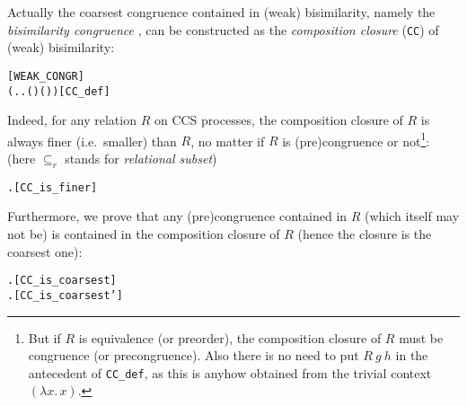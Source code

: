 Actually the coarsest congruence
contained in (weak) bisimilarity, namely the \emph{bisimilarity
  congruence} \cite{van2005characterisation}, can be constructed as
the \emph{composition closure} (\texttt{CC}) of (weak) bisimilarity:
\begin{alltt}
 \HOLSymConst{=}  \hfill{[WEAK_CONGR]}
  \HOLSymConst{=} (\HOLTokenLambda{} . \HOLSymConst{\HOLTokenForall{}}.   \HOLSymConst{\HOLTokenImp{}}  ( ) ( ))\hfill{[CC_def]}
\end{alltt}
Indeed, for any relation $R$ 
on CCS processes, the composition closure of $R$ is always finer (i.e.~smaller) than
$R$, no matter if $R$ is (pre)congruence or not\footnote{But if $R$ is
  equivalence (or preorder), the composition closure of $R$ must be congruence
  (or precongruence). Also there is no need to put $R\ g\ h$ in the antecedent of
\texttt{CC\_def}, as this is anyhow obtained from the trivial context $(\lambda x.\,x)$.}: (here $\subseteq_r$ stands for \emph{relational subset})
\begin{alltt}
\HOLTokenTurnstile{} \HOLSymConst{\HOLTokenForall{}}.   \HOLSymConst{\HOLTokenRSubset{}} \hfill{[CC_is_finer]}
\end{alltt}
Furthermore, we prove that any (pre)congruence contained in $R$ (which
itself may not be) is contained in the composition closure of $R$
(hence the closure is the coarsest one):
\begin{alltt}
\HOLTokenTurnstile{} \HOLSymConst{\HOLTokenForall{}} .   \HOLSymConst{\HOLTokenConj{}}  \HOLSymConst{\HOLTokenRSubset{}}  \HOLSymConst{\HOLTokenImp{}}  \HOLSymConst{\HOLTokenRSubset{}}  \hfill{[CC_is_coarsest]}
\HOLTokenTurnstile{} \HOLSymConst{\HOLTokenForall{}} .   \HOLSymConst{\HOLTokenConj{}}  \HOLSymConst{\HOLTokenRSubset{}}  \HOLSymConst{\HOLTokenImp{}}  \HOLSymConst{\HOLTokenRSubset{}}  \hfill{[CC_is_coarsest']}
\end{alltt}

